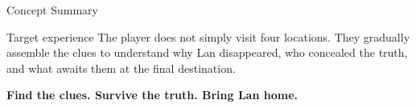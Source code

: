 \documentclass[aspectratio=169,10pt]{beamer}
\begin{document}
\begin{frame}{Concept Summary}
  \begin{block}{Target experience}
    The player does not simply visit four locations. They gradually assemble the clues to understand why Lan disappeared, who concealed the truth, and what awaits them at the final destination.
  \end{block}

  \vspace{0.5cm}
  \begin{center}
    \Large\textcolor{GameGreen}{\textbf{Find the clues. Survive the truth. Bring Lan home.}}
  \end{center}
\end{frame}
\end{document}

